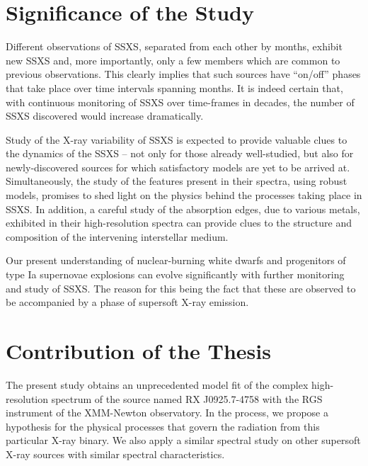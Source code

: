     \section{Significance of the Study} \label{introduction:significance}
        Different observations of SSXS, separated from each other by months, exhibit new SSXS and, more importantly, only a few members which are common to previous observations. This clearly implies that such sources have ``on/off'' phases that take place over time intervals spanning months. It is indeed certain that, with continuous monitoring of SSXS over time-frames in decades, the number of SSXS discovered would increase dramatically.
        
        Study of the X-ray variability of SSXS is expected to provide valuable clues to the dynamics of the SSXS -- not only for those already well-studied, but also for newly-discovered sources for which satisfactory models are yet to be arrived at. Simultaneously, the study of the features present in their spectra, using robust models, promises to shed light on the physics behind the processes taking place in SSXS. In addition, a careful study of the absorption edges, due to various metals, exhibited in their high-resolution spectra can provide clues to the structure and composition of the intervening interstellar medium.
        
        Our present understanding of nuclear-burning white dwarfs and progenitors of type Ia supernovae explosions can evolve significantly with further monitoring and study of SSXS. The reason for this being the fact that these are observed to be accompanied by a phase of supersoft X-ray emission.
    
    \section{Contribution of the Thesis} \label{introduction:thesis_contribution}
        The present study obtains an unprecedented model fit of the complex high-resolution spectrum of the source named RX J0925.7-4758 with the RGS instrument of the XMM-Newton observatory. In the process, we propose a hypothesis for the physical processes that govern the radiation from this particular X-ray binary. We also apply a similar spectral study on other supersoft X-ray sources with similar spectral characteristics.
    
